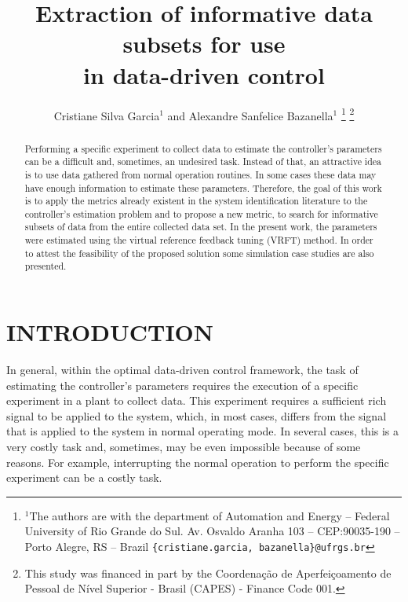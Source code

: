 \documentclass[letterpaper, 10 pt, conference]{ieeeconf}  %
\title{\LARGE \bf
Extraction of informative data subsets for use \\ in data-driven control
}
\author{Cristiane Silva Garcia$^{1}$ and Alexandre Sanfelice Bazanella$^{1}$%
\thanks{$^{1}$The authors are with the department of Automation and Energy -- Federal University of Rio Grande do Sul. Av. Osvaldo Aranha 103 -- CEP:90035-190 -- Porto Alegre, RS -- Brazil
        {\tt\small \{cristiane.garcia, bazanella\}@ufrgs.br}}%
\thanks{This study was financed in part by the Coordena\c{c}\~{a}o de Aperfei\c{c}oamento de Pessoal de N\'{i}vel Superior - Brasil (CAPES) - Finance Code 001.}
}
\begin{document}


\maketitle
\thispagestyle{empty}
\pagestyle{empty}


\begin{abstract}


Performing a specific experiment to collect data to estimate the controller's parameters can be a difficult and, sometimes, an undesired task.
Instead of that, an attractive idea is to use data gathered from normal operation routines.
In some cases these data may have enough information to estimate these parameters.
Therefore, the goal of this work is to apply the metrics already existent in the system identification literature to the controller's estimation problem and to propose a new metric, to search for informative subsets of data from the entire collected data set.
In the present work, the parameters were estimated using the virtual reference feedback tuning (VRFT) method.
In order to attest the feasibility of the proposed solution some simulation case studies are also presented.


\end{abstract}

\section{INTRODUCTION}


In general, within the optimal data-driven control framework, the task of estimating the controller's parameters requires the execution of a specific experiment in a plant to collect data.
This experiment requires a sufficient rich signal to be applied to the system, which, in most cases, differs from the signal that is applied to the system in normal operating mode.
In several cases, this is a very costly task and, sometimes, may be even impossible because of some reasons.
For example, interrupting the normal operation to perform the specific experiment can be a costly task.
\end{document}
